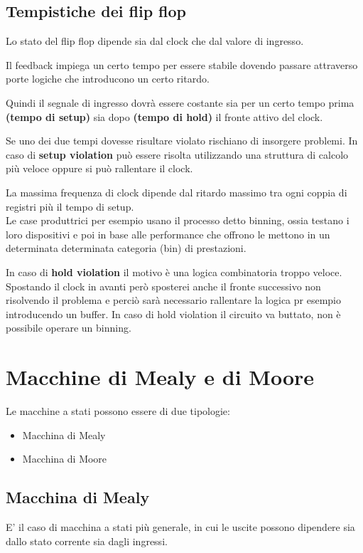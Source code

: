 \documentclass[a4paper]{book}
\begin{document}
\subsection*{Tempistiche dei flip flop}

Lo stato del flip flop dipende sia dal clock che dal valore di ingresso.

Il feedback impiega un certo tempo per essere stabile dovendo passare attraverso porte logiche che introducono un certo ritardo.

Quindi il segnale di ingresso dovrà essere costante sia per un certo tempo prima \textbf{(tempo di setup)} sia dopo \textbf{(tempo di hold)} il fronte attivo del clock.

Se uno dei due tempi dovesse risultare violato rischiano di insorgere problemi.
In caso di \textbf{setup violation} può essere risolta utilizzando una struttura di calcolo più veloce oppure si può rallentare il clock.

La massima frequenza di clock dipende dal ritardo massimo tra ogni coppia di registri più il tempo di setup.\\
Le case produttrici per esempio usano il processo detto binning, ossia testano i loro dispositivi e poi in base alle performance che offrono le mettono in un determinata determinata categoria (bin) di prestazioni.

In caso di \textbf{hold violation} il motivo è una logica combinatoria troppo veloce.
Spostando il clock in avanti però sposterei anche il fronte successivo non risolvendo il problema e perciò sarà necessario rallentare la logica pr esempio introducendo un buffer.
In caso di hold violation il circuito va buttato, non è possibile operare un binning.


\section{Macchine di Mealy e di Moore}

Le macchine a stati possono essere di due tipologie:
\begin{itemize}
\item Macchina di Mealy
\item Macchina di Moore
\end{itemize}

\subsection*{Macchina di Mealy}

E' il caso di macchina a stati più generale, in cui le uscite possono dipendere sia dallo stato corrente sia dagli ingressi.
\end{document}
